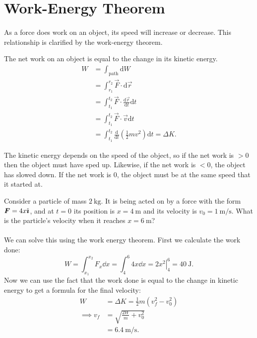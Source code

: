 \documentclass[../classical_mechanics.tex]{subfiles}
\begin{document}
    \section{Work-Energy Theorem}
        \paragraph{}
        As a force does work on an object, its speed will increase or decrease.
        This relationship is clarified by the work-energy theorem.
        \begin{theorem}
            The net work on an object is equal to the change in its kinetic energy.
            \begin{align}
                W&=\int_\mathrm{path}\mathrm{d}W\\
                &=\int_{r_1}^{r_2}\vec{F}\cdot\mathrm{d}\vec{r}\\
                &=\int_{t_1}^{t_2}\vec{F}\cdot\frac{\mathrm{d}\vec{r}}{\mathrm{d}t}\mathrm{d}t\\
                &=\int_{t_1}^{t_2}\vec{F}\cdot\vec{v}\mathrm{d}t\\
                &=\int_{t_1}^{t_2}\frac{\mathrm{d}}{\mathrm{d}t}\left(\frac{1}{2}mv^2\right)\mathrm{d}t=\Delta K.
            \end{align}
        \end{theorem}
        The kinetic energy depends on the speed of the object, so if the net work is $>0$ then the object must have sped up.
        Likewise, if the net work is $<0$, the object has slowed down.
        If the net work is 0, the object must be at the same speed that it started at.
        \begin{example}
            Consider a particle of mass $\qty{2}{\kilogram}$.
            It is being acted on by a force with the form $\boldsymbol{F}=4x\hat{\boldsymbol{\imath}}$, and at $t=0$ its position is $x=\qty{4}{\meter}$ and its velocity is $v_0=\qty{1}{\meter\per\second}$.
            What is the particle's velocity when it reaches $x=\qty{6}{\meter}$?

            \paragraph{}
            We can solve this using the work energy theorem.
            First we calculate the work done:
            \begin{equation}
                W=\int_{x_1}^{x_2}F_x\dd{x}=\int_{4}^{6}4x\dd{x}=\left.2x^2\right|_4^6=\qty{40}{\joule}.
            \end{equation}
            Now we can use the fact that the work done is equal to the change in kinetic energy to get a formula for the final velocity:
            \begin{align}
                W&=\Delta K=\frac{1}{2}m(v_f^2-v_0^2)\\
                \implies v_f&=\sqrt{\frac{2W}{m}+v_0^2}\\
                &=\qty{6.4}{\meter\per\second}.
            \end{align}
        \end{example}
\end{document}
